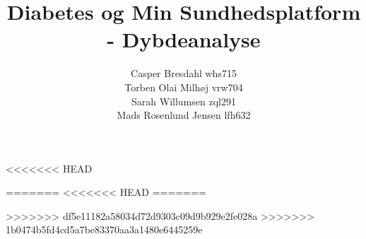 \documentclass[12pt]{article}
\title{Diabetes og Min Sundhedsplatform - Dybdeanalyse}
\author{Casper Bresdahl whs715\\ Torben Olai Milhøj vrw704\\ Sarah Willumsen zql291\\ Mads Rosenlund Jensen lfh632\\}
\date{}
\begin{document}
        \maketitle
        \thispagestyle{empty}
        \chead{}
        \lhead{}
        \rhead{}
        \renewcommand{\headrulewidth}{0pt}

        \pagestyle{empty}
        {
        	\renewcommand{\thispagestyle}[1]{}
        	\tableofcontents
        }
        \clearpage
        \pagestyle{fancy}
        \newpage
        \setcounter{page}{1}
<<<<<<< HEAD
            
            
            
        	
        	
            
        	
               
              
=======
<<<<<<< HEAD
=======
        
        
        
        
        
        
        
        
        
        
>>>>>>> df5e11182a58034d72d9303c09d9b929e2fe028a
>>>>>>> 1b0474b5fd4cd5a7be83370aa3a1480e6445259e
        
\end{document}
